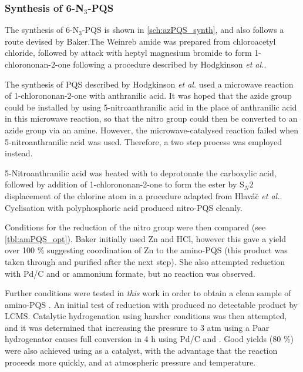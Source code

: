 \subsubsection{Synthesis of 6-N$_3$-PQS }

The synthesis of 6-N$_3$-PQS  is shown in \ref{sch:azPQS_synth}, and also follows a route devised by Baker\cite{Baker2015}.The Weinreb amide \cite{Hodgkinson2011} was prepared from chloroacetyl chloride, followed by attack with heptyl magnesium bromide  to form 1-chlorononan-2-one  following a procedure described by Hodgkinson \textit{et al.}\cite{Hodgkinson2012}. 

The synthesis of PQS  described by Hodgkinson \textit{et al.}\cite{Hodgkinson2012} used a microwave reaction of 1-chlorononan-2-one  with anthranilic acid. It was hoped that the azide group could be installed by using 5-nitroanthranilic acid  in the place of anthranilic acid in this microwave reaction, so that the nitro group could then be converted to an azide group via an amine. However, the microwave-catalysed reaction failed when 5-nitroanthranilic acid  was used\cite{Baker2015}. Therefore, a two step process was employed instead. 

5-Nitroanthranilic acid  was heated with  to deprotonate the carboxylic acid, followed by addition of 1-chlorononan-2-one  to form the ester  by S$_N$2 displacement of the chlorine atom in a procedure adapted from Hlav\'a\u c \textit{et al.}\cite{Hlavac2004}. Cyclisation with polyphosphoric acid produced nitro-PQS  cleanly\cite{Hlavac2004,Hradil1999}. 

Conditions for the reduction of the nitro group were then compared (see \ref{tbl:amPQS_opt}). Baker initially used Zn and HCl, however this gave a yield over 100 \% suggesting coordination of Zn to the amino-PQS \cite{Baker2015} (this product was taken through and purified after the next step). She also attempted reduction with Pd/C and  or ammonium formate, but no reaction was observed.

Further conditions were tested in \textit{this} work in order to obtain a clean sample of amino-PQS .
An initial test of reduction with  produced no detectable product by LCMS. 
Catalytic hydrogenation using harsher conditions was then attempted, and it was determined that increasing the pressure to 3 atm using a Paar hydrogenator causes full conversion in 4 h using Pd/C and . 
Good yields (80 \%) were also achieved using  as a catalyst, with the advantage that the reaction proceeds more quickly, and at atmospheric pressure and temperature\cite{Shen2006a}. 

